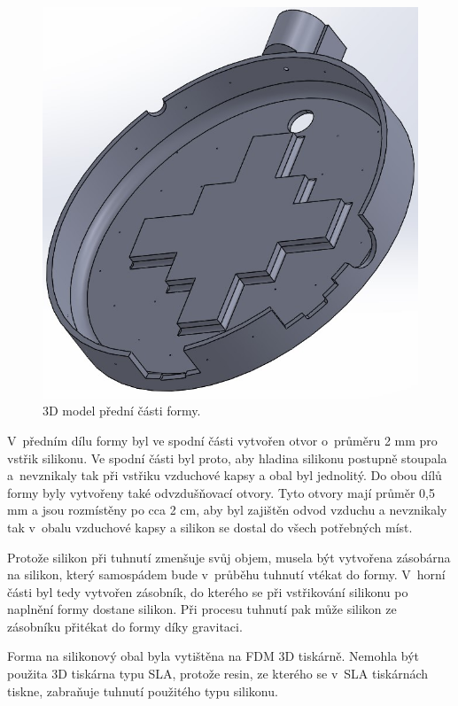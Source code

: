 \begin{figure}[!h]
  \begin{center}
    \includegraphics[scale=0.4]{obrazky/forma_predni.jpg}
  \end{center}
  \caption[3D model přední části formy]{3D model přední části formy.}
\end{figure}

V~předním dílu formy byl ve spodní části vytvořen otvor o~průměru 2 mm pro vstřik silikonu. Ve spodní části byl proto, aby hladina silikonu postupně stoupala a~nevznikaly tak při vstřiku vzduchové 
kapsy a obal byl jednolitý. Do obou dílů formy byly vytvořeny také odvzdušňovací otvory. Tyto otvory mají průměr 0,5 mm a jsou rozmístěny po cca 2 cm, aby byl zajištěn odvod vzduchu a nevznikaly tak 
v~obalu vzduchové kapsy a silikon se dostal do všech potřebných míst. 

Protože silikon při tuhnutí zmenšuje svůj objem, musela být vytvořena zásobárna na silikon, který samospádem bude v~průběhu tuhnutí vtékat do formy. V~horní části byl tedy vytvořen zásobník, do kterého 
se při vstřikování silikonu po naplnění formy dostane silikon. Při procesu tuhnutí pak může silikon ze zásobníku přitékat do formy díky gravitaci. 

Forma na silikonový obal byla vytištěna na FDM 3D tiskárně. Nemohla být použita 3D tiskárna typu SLA, protože resin, ze kterého se v~SLA tiskárnách tiskne, zabraňuje tuhnutí použitého typu silikonu. 

